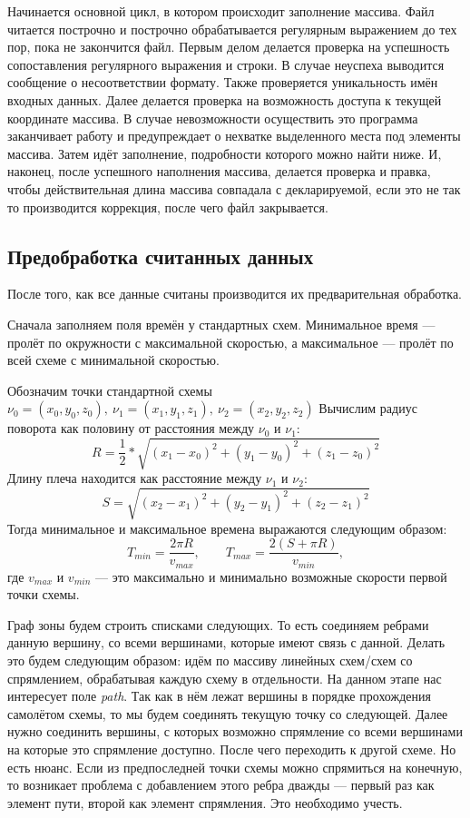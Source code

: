 \documentclass[12pt]{article}
\theoremstyle{plain}
\begin{document}
Начинается основной цикл, в котором происходит заполнение массива. Файл читается построчно и построчно обрабатывается регулярным выражением до тех пор, пока не закончится файл. Первым делом делается проверка на успешность сопоставления регулярного выражения и строки. В случае неуспеха выводится сообщение о несоответствии формату. Также проверяется уникальность имён входных данных. Далее делается проверка на возможность доступа к текущей координате массива. В случае невозможности осуществить это программа заканчивает работу и предупреждает о нехватке выделенного места под элементы массива. Затем идёт заполнение, подробности которого можно найти ниже. И, наконец, после успешного наполнения массива, делается проверка и правка, чтобы действительная длина массива совпадала с декларируемой, если это не так то производится коррекция, после чего файл закрывается.

\subsection{Предобработка считанных данных}

После того, как все данные считаны производится их предварительная обработка.

Сначала заполняем поля времён у стандартных схем. Минимальное время --- пролёт по окружности с максимальной скоростью, а максимальное --- пролёт по всей схеме с минимальной скоростью.

Обозначим точки стандартной схемы $\nu_0 = (x_0, y_0, z_0),~ \nu_1 = (x_1, y_1, z_1),~ \nu_2 = (x_2, y_2, z_2)$
Вычислим радиус поворота как половину от расстояния между $\nu_0$ и $\nu_1$:
$$
  R = \frac{1}{2} \ast \sqrt{(x_1 - x_0)^2 + (y_1 - y_0)^2 + (z_1 - z_0)^2}
$$
Длину плеча находится как расстояние между $\nu_1$ и $\nu_2$:
$$
  S = \sqrt{(x_2 - x_1)^2 + (y_2 - y_1)^2 + (z_2 - z_1)^2}
$$
Тогда минимальное и максимальное времена выражаются следующим образом:
$$
  T_{min} = \frac{2 \pi R}{v_{max}}, \qquad 
    T_{max} = \frac{2(S + \pi R)}{v_{min}},
$$
где $v_{max}$ и $v_{min}$ --- это максимально и минимально возможные скорости первой точки схемы.

Граф зоны будем строить списками следующих. То есть соединяем ребрами данную вершину, со всеми вершинами, которые имеют связь с данной. Делать это будем следующим образом: идём по массиву линейных схем/схем со спрямлением, обрабатывая каждую схему в отдельности. На данном этапе нас интересует поле \textit{path}. Так как в нём лежат вершины в порядке прохождения самолётом схемы, то мы будем соединять текущую точку со следующей. Далее нужно соединить вершины, с которых возможно спрямление со всеми вершинами на которые это спрямление доступно. После чего переходить к другой схеме. Но есть нюанс. Если из предпоследней точки схемы можно спрямиться на конечную, то возникает проблема с добавлением этого ребра дважды --- первый раз как элемент пути, второй как элемент спрямления. Это необходимо учесть. 
\end{document}

